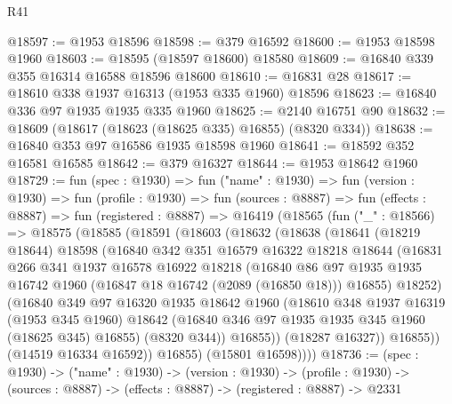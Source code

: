 \begin{lexlean}{R41}
\begin{coremodule}
@18597 := @1953 @18596
@18598 := @379 @16592
@18600 := @1953 @18598 @1960
@18603 := @18595 (@18597 @18600) @18580
@18609 := @16840 @339 @355 @16314 @16588 @18596 @18600
@18610 := @16831 @28
@18617 := @18610 @338 @1937 @16313 (@1953 @335 @1960) @18596
@18623 := @16840 @336 @97 @1935 @1935 @335 @1960
@18625 := @2140 @16751 @90
@18632 := @18609 (@18617 (@18623 (@18625 @335) @16855) (@8320 @334))
@18638 := @16840 @353 @97 @16586 @1935 @18598 @1960
@18641 := @18592 @352 @16581 @16585
@18642 := @379 @16327
@18644 := @1953 @18642 @1960
@18729 := fun (spec : @1930) =>
  fun ("name" : @1930) =>
  fun (version : @1930) =>
  fun (profile : @1930) =>
  fun (sources : @8887) =>
  fun (effects : @8887) =>
  fun (registered : @8887) =>
  @16419
    (@18565
      (fun ("_" : @18566) =>
      @18575
        (@18585
          (@18591
            (@18603
              (@18632
                (@18638
                  (@18641
                    (@18219 @18644)
                    @18598
                    (@16840
                      @342
                      @351
                      @16579
                      @16322
                      @18218
                      @18644
                      (@16831
                        @266
                        @341
                        @1937
                        @16578
                        @16922
                        @18218
                        (@16840
                          @86
                          @97
                          @1935
                          @1935
                          @16742
                          @1960
                          (@16847 @18 @16742 (@2089 (@16850 @18)))
                          @16855)
                        @18252)
                      (@16840
                        @349
                        @97
                        @16320
                        @1935
                        @18642
                        @1960
                        (@18610
                          @348
                          @1937
                          @16319
                          (@1953 @345 @1960)
                          @18642
                          (@16840 @346 @97 @1935 @1935 @345 @1960 (@18625 @345) @16855)
                          (@8320 @344))
                        @16855))
                    (@18287 @16327))
                  @16855))
              (@14519 @16334 @16592))
            @16855)
          (@15801 @16598))))
@18736 := (spec : @1930) ->
  ("name" : @1930) ->
  (version : @1930) ->
  (profile : @1930) -> (sources : @8887) -> (effects : @8887) -> (registered : @8887) -> @2331

\end{coremodule}
\end{lexlean}

